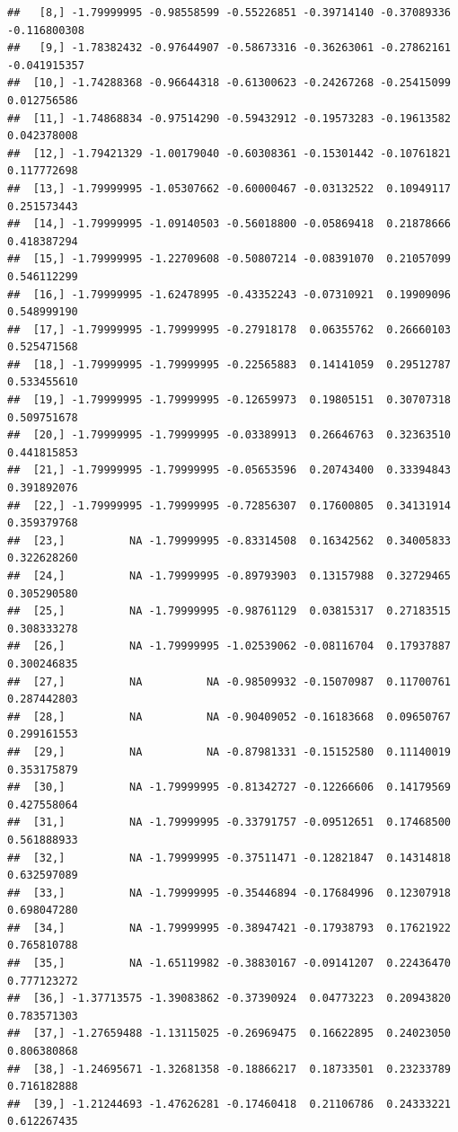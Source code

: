 \documentclass{article}\usepackage[]{graphicx}\usepackage[]{color}
\makeatletter
\newenvironment{kframe}{%
 \def\at@end@of@kframe{}%
 \ifinner\ifhmode%
  \def\at@end@of@kframe{\end{minipage}}%
  \begin{minipage}{\columnwidth}%
 \fi\fi%
 \def\FrameCommand##1{\hskip\@totalleftmargin \hskip-\fboxsep
 \colorbox{shadecolor}{##1}\hskip-\fboxsep
     \hskip-\linewidth \hskip-\@totalleftmargin \hskip\columnwidth}%
 \MakeFramed {\advance\hsize-\width
   \@totalleftmargin\z@ \linewidth\hsize
   \@setminipage}}%
 {\par\unskip\endMakeFramed%
 \at@end@of@kframe}
\newenvironment{knitrout}{}{} %
\makeatother
\begin{document}
\begin{knitrout}
\begin{kframe}
\begin{verbatim}
##   [8,] -1.79999995 -0.98558599 -0.55226851 -0.39714140 -0.37089336 -0.116800308
##   [9,] -1.78382432 -0.97644907 -0.58673316 -0.36263061 -0.27862161 -0.041915357
##  [10,] -1.74288368 -0.96644318 -0.61300623 -0.24267268 -0.25415099  0.012756586
##  [11,] -1.74868834 -0.97514290 -0.59432912 -0.19573283 -0.19613582  0.042378008
##  [12,] -1.79421329 -1.00179040 -0.60308361 -0.15301442 -0.10761821  0.117772698
##  [13,] -1.79999995 -1.05307662 -0.60000467 -0.03132522  0.10949117  0.251573443
##  [14,] -1.79999995 -1.09140503 -0.56018800 -0.05869418  0.21878666  0.418387294
##  [15,] -1.79999995 -1.22709608 -0.50807214 -0.08391070  0.21057099  0.546112299
##  [16,] -1.79999995 -1.62478995 -0.43352243 -0.07310921  0.19909096  0.548999190
##  [17,] -1.79999995 -1.79999995 -0.27918178  0.06355762  0.26660103  0.525471568
##  [18,] -1.79999995 -1.79999995 -0.22565883  0.14141059  0.29512787  0.533455610
##  [19,] -1.79999995 -1.79999995 -0.12659973  0.19805151  0.30707318  0.509751678
##  [20,] -1.79999995 -1.79999995 -0.03389913  0.26646763  0.32363510  0.441815853
##  [21,] -1.79999995 -1.79999995 -0.05653596  0.20743400  0.33394843  0.391892076
##  [22,] -1.79999995 -1.79999995 -0.72856307  0.17600805  0.34131914  0.359379768
##  [23,]          NA -1.79999995 -0.83314508  0.16342562  0.34005833  0.322628260
##  [24,]          NA -1.79999995 -0.89793903  0.13157988  0.32729465  0.305290580
##  [25,]          NA -1.79999995 -0.98761129  0.03815317  0.27183515  0.308333278
##  [26,]          NA -1.79999995 -1.02539062 -0.08116704  0.17937887  0.300246835
##  [27,]          NA          NA -0.98509932 -0.15070987  0.11700761  0.287442803
##  [28,]          NA          NA -0.90409052 -0.16183668  0.09650767  0.299161553
##  [29,]          NA          NA -0.87981331 -0.15152580  0.11140019  0.353175879
##  [30,]          NA -1.79999995 -0.81342727 -0.12266606  0.14179569  0.427558064
##  [31,]          NA -1.79999995 -0.33791757 -0.09512651  0.17468500  0.561888933
##  [32,]          NA -1.79999995 -0.37511471 -0.12821847  0.14314818  0.632597089
##  [33,]          NA -1.79999995 -0.35446894 -0.17684996  0.12307918  0.698047280
##  [34,]          NA -1.79999995 -0.38947421 -0.17938793  0.17621922  0.765810788
##  [35,]          NA -1.65119982 -0.38830167 -0.09141207  0.22436470  0.777123272
##  [36,] -1.37713575 -1.39083862 -0.37390924  0.04773223  0.20943820  0.783571303
##  [37,] -1.27659488 -1.13115025 -0.26969475  0.16622895  0.24023050  0.806380868
##  [38,] -1.24695671 -1.32681358 -0.18866217  0.18733501  0.23233789  0.716182888
##  [39,] -1.21244693 -1.47626281 -0.17460418  0.21106786  0.24333221  0.612267435

\end{verbatim}
\end{kframe}
\end{knitrout}
\end{document}
